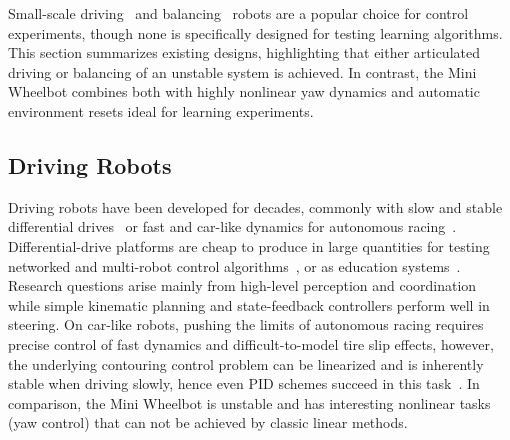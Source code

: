 Small-scale driving~\cite{mondada1994mobile,johnson2006mobile,mondada2009puck,rubenstein2015aerobot,pickem2015gritsbot,wilson2016pheeno, paull2017duckietown, hsieh2006economical, liniger2015optimization, carron2023chronos, bodmer2024optimization, goldfain2019autorally, o2020f1tenth, gonzales2018planning} and balancing~\cite{gajamohan2012cubli, mayr2015mechatronic, muehlebach2016nonlinear, hofer2023one, klemm2019ascento, nagarajan2014ballbot, geist2022wheelbot} robots are a popular choice for control experiments, though none is specifically designed for testing learning algorithms.
This section summarizes existing designs, highlighting that either articulated driving or balancing of an unstable system is achieved.
In contrast, the Mini Wheelbot combines both with highly nonlinear yaw dynamics and automatic environment resets ideal for learning experiments.









\subsection{Driving Robots}
Driving robots have been developed for decades, commonly with slow and stable differential drives~\cite{mondada1994mobile,johnson2006mobile,mondada2009puck,rubenstein2015aerobot,pickem2015gritsbot,wilson2016pheeno, paull2017duckietown} or fast and car-like dynamics for autonomous racing~\cite{hsieh2006economical, liniger2015optimization, carron2023chronos, bodmer2024optimization, goldfain2019autorally, o2020f1tenth, gonzales2018planning}.
Differential-drive platforms are cheap to produce in large quantities for testing networked and multi-robot control algorithms~\cite{johnson2006mobile, paull2017duckietown, wilson2016pheeno,pickem2015gritsbot, pickem2017robotarium, schwab2020experimental}, or as education systems~\cite{mondada1994mobile, mondada2009puck, rubenstein2015aerobot}.
Research questions arise mainly from high-level perception and coordination while simple kinematic planning and state-feedback controllers perform well in steering.
On car-like robots, pushing the limits of autonomous racing requires precise control of fast dynamics and difficult-to-model tire slip effects, however, the underlying contouring control problem can be linearized and is inherently stable when driving slowly, hence even PID schemes succeed in this task~\cite{carron2023chronos}.
In comparison, the Mini Wheelbot is unstable and has interesting nonlinear tasks (yaw control) that can not be achieved by classic linear methods.

